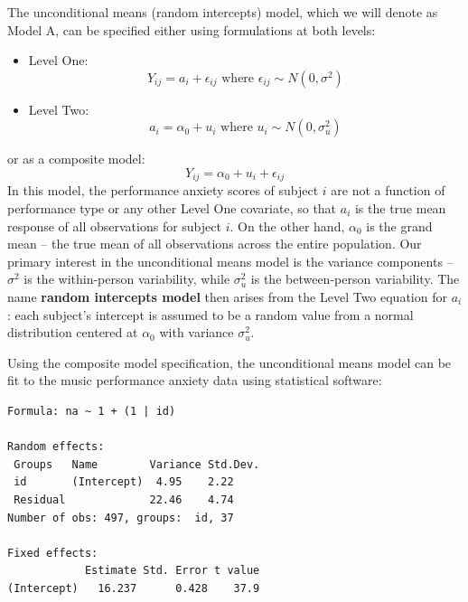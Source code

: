 \documentclass[
]{krantz}
\providecommand{\tightlist}{%
  \setlength{\itemsep}{0pt}\setlength{\parskip}{0pt}}
\begin{document}
The unconditional means (random intercepts) model, which we will denote as Model A, can be specified either using formulations at both levels:

\begin{itemize}
\tightlist
\item
  Level One:
  \begin{equation}
  Y_{ij} = a_{i}+\epsilon_{ij} \textrm{ where } \epsilon_{ij}\sim N(0,\sigma^2)
  \label{eq:level1uncmean}
  \end{equation}
\item
  Level Two:
  \begin{equation}
  a_{i} = \alpha_{0}+u_{i} \textrm{ where } u_{i}\sim N(0,\sigma_{u}^{2})
  \label{eq:level2uncmean}
  \end{equation}
\end{itemize}

or as a composite model:
\begin{equation}
Y_{ij}=\alpha_{0}+u_{i}+\epsilon_{ij}
\label{eq:compuncmean}
\end{equation}
In this model, the performance anxiety scores of subject \(i\) are not a function of performance type or any other Level One covariate, so that \(a_{i}\) is the true mean response of all observations for subject \(i\). On the other hand, \(\alpha_{0}\) is the grand mean -- the true mean of all observations across the entire population. Our primary interest in the unconditional means model is the variance components -- \(\sigma^2\) is the within-person variability, while \(\sigma_{u}^{2}\) is the between-person variability. The name \textbf{random intercepts model} then arises from the Level Two equation for \(a_{i}\): each subject's intercept is assumed to be a random value from a normal distribution centered at \(\alpha_{0}\) with variance \(\sigma_{u}^{2}\).

Using the composite model specification, the unconditional means model can be fit to the music performance anxiety data using statistical software:

\begin{verbatim}
Formula: na ~ 1 + (1 | id)

Random effects:
 Groups   Name        Variance Std.Dev.
 id       (Intercept)  4.95    2.22    
 Residual             22.46    4.74    
Number of obs: 497, groups:  id, 37

Fixed effects:
            Estimate Std. Error t value
(Intercept)   16.237      0.428    37.9
\end{verbatim}
\end{document}
